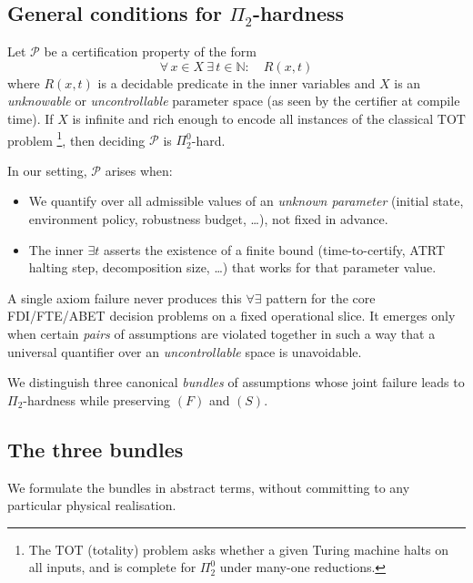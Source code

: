 \documentclass[12pt]{article}
\theoremstyle{definition}
\theoremstyle{plain}
\begin{document}
\subsection{General conditions for \texorpdfstring{$\Pi_2$}{Pi2}-hardness}
\label{subsec:pi2-general-conditions}

Let \(\mathcal{P}\) be a certification property of the form
\[
\forall\, x\in X\ \exists\, t\in\mathbb{N}:\quad R(x,t)
\]
where \(R(x,t)\) is a decidable predicate in the inner variables 
and \(X\) is an \emph{unknowable} or \emph{uncontrollable} parameter space 
(as seen by the certifier at compile time).
If \(X\) is infinite and rich enough to encode 
all instances of the classical \(\mathrm{TOT}\) problem%
\footnote{%
The \(\mathrm{TOT}\) (totality) problem asks 
whether a given Turing machine halts on all inputs, 
and is complete for \(\Pi^0_2\) under many-one reductions.
}, 
then deciding \(\mathcal{P}\) is \(\Pi^0_2\)-hard.

In our setting, \(\mathcal{P}\) arises when:
\begin{itemize}[leftmargin=1.5em]
\item We quantify over all admissible values of an \emph{unknown parameter} 
  (initial state, environment policy, robustness budget, \ldots),
  not fixed in advance.
\item The inner \(\exists t\) asserts the existence of a finite bound 
  (time-to-certify, ATRT halting step, decomposition size, \ldots) 
  that works for that parameter value.
\end{itemize}
A single axiom failure never produces this \(\forall\exists\) pattern 
for the core FDI/FTE/ABET decision problems on a fixed operational slice. 
It emerges only when certain \emph{pairs} of assumptions are violated together 
in such a way that a universal quantifier over an 
\emph{uncontrollable} space is unavoidable.

We distinguish three canonical \emph{bundles} of assumptions 
whose joint failure leads to \(\Pi_2\)-hardness 
while preserving \((F)\) and \((S)\).

\subsection{The three bundles}
\label{subsec:pi2-bundles}

We formulate the bundles in abstract terms, 
without committing to any particular physical realisation.
\end{document}

